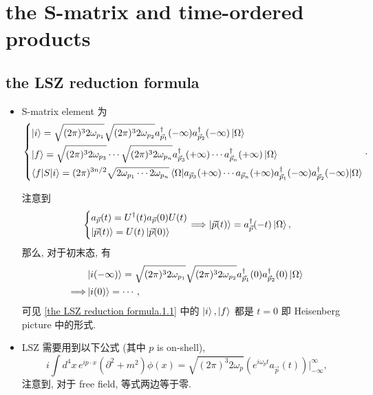 \chapter{the S-matrix and time-ordered products}
\section{the LSZ reduction formula}
\begin{itemize}
	\item S-matrix element 为
	\begin{equation}\label{the LSZ reduction formula.1.1}
		\begin{dcases}
			\ket{i} = \sqrt{(2 \pi)^3 2 \omega_{p_1}} \sqrt{(2 \pi)^3 2 \omega_{p_2}} a^\dag_{\vec{p}_1}(- \infty) a^\dag_{\vec{p}_2}(- \infty) \ket{\Omega} \\
			\ket{f} = \sqrt{(2 \pi)^3 2 \omega_{p_3}} \cdots \sqrt{(2 \pi)^3 2 \omega_{p_n}} a^\dag_{\vec{p}_3}(+ \infty) \cdots a^\dag_{\vec{p}_n}(+ \infty) \ket{\Omega} \\
			\braket{f | S | i} = (2 \pi)^{3 n / 2} \sqrt{2 \omega_{p_1} \cdots 2 \omega_{p_n}} \braket{\Omega | a_{\vec{p}_3}(+ \infty) \cdots a_{\vec{p}_n}(+ \infty) a^\dag_{\vec{p}_1}(- \infty) a^\dag_{\vec{p}_2}(- \infty) | \Omega}
		\end{dcases}.
	\end{equation}
	
	\begin{tcolorbox}[title=remark:]
		注意到
		\begin{equation}
			\begin{dcases}
				a_{\vec{p}}(t) = U^\dag(t) a_{\vec{p}}(0) U(t) \\
				\ket{\vec{p}(t)} = U(t) \ket{\vec{p}(0)}
			\end{dcases} \Longrightarrow \ket{\vec{p}(t)} = a^\dag_{\vec{p}}(- t) \ket{\Omega},
		\end{equation}
		那么, 对于初末态, 有
		\begin{align}
			& \ket{i(- \infty)} = \sqrt{(2 \pi)^3 2 \omega_{p_1}} \sqrt{(2 \pi)^3 2 \omega_{p_2}} a^\dag_{\vec{p}_1}(0) a^\dag_{\vec{p}_2}(0) \ket{\Omega} \notag \\
			\Longrightarrow & \ket{i(0)} = \cdots,
		\end{align}
		可见 \eqref{the LSZ reduction formula.1.1} 中的 $\ket{i}, \ket{f}$ 都是 $t = 0$ 即 Heisenberg picture 中的形式.
	\end{tcolorbox}
	
	\item LSZ 需要用到以下公式 (其中 $p$ is on-shell),
	\begin{equation} \label{the S-matrix and time-ordered products.1.4}
		i \int d^4 x \, e^{i p \cdot x} (\partial^2 + m^2) \phi(x) = \sqrt{(2 \pi)^3 2 \omega_p} (e^{i \omega_p t} a_{\vec{p}}(t)) \Big|^\infty_{- \infty},
	\end{equation}
	注意到, 对于 free field, 等式两边等于零.
	

\end{itemize}
